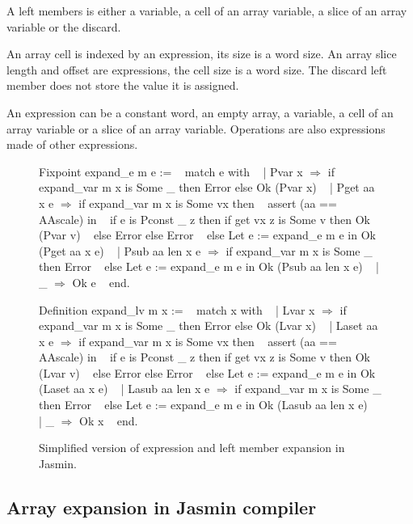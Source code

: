 \documentclass{article}
\begin{document}
\smallskip

A left members is either a variable, a cell of an array variable, a slice of an
array variable or the discard.

An array cell is indexed by an expression, its size is a word size. An array
slice length and offset are expressions, the cell size is a word size. The
discard left member does not store the value it is assigned.

An expression can be a constant word, an empty array, a variable, a cell of an
array variable or a slice of an array variable. Operations are also expressions
made of other expressions.

\begin{figure}[t]
\obeylines\obeyspaces\ttfamily%
Fixpoint expand\_e m e := 
~ match e with
~ | Pvar x \(\Rightarrow\) if expand\_var m x is Some \_ then Error else Ok (Pvar x)
~ | Pget aa x e \(\Rightarrow\) if expand\_var m x is Some vx then
~     assert (aa == AAscale) in
~     if e is Pconst \_ z then if get vx z is Some v then Ok (Pvar v)
~     else Error else Error
~   else Let e := expand\_e m e in Ok (Pget aa x e)
~ | Psub aa len x e \(\Rightarrow\) if expand\_var m x is Some \_ then Error
~   else Let e := expand\_e m e in Ok (Psub aa len x e)
~ | \_ \(\Rightarrow\) Ok e
~ end.

Definition expand\_lv m x :=
~ match x with
~ | Lvar x \(\Rightarrow\) if expand\_var m x is Some \_ then Error else Ok (Lvar x)
~ | Laset aa x e \(\Rightarrow\) if expand\_var m x is Some vx then
~     assert (aa == AAscale) in
~     if e is Pconst \_ z then if get vx z is Some v then Ok (Lvar v)
~     else Error else Error
~   else Let e := expand\_e m e in Ok (Laset aa x e)
~ | Lasub aa len x e \(\Rightarrow\) if expand\_var m x is Some \_ then Error
~   else Let e := expand\_e m e in Ok (Lasub aa len x e)
~ | \_ \(\Rightarrow\) Ok x
~ end.
\normalfont%
\caption{Simplified version of expression and left member expansion in Jasmin.}
\end{figure}

\subsection{Array expansion in Jasmin compiler}
\end{document}
